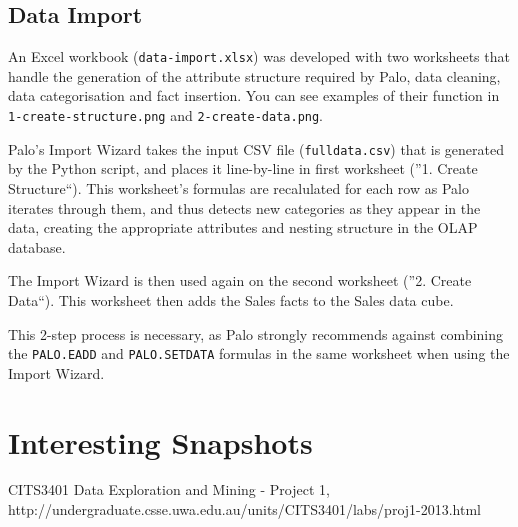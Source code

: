 \documentclass[12pt, a4paper]{article}
\begin{document}
\subsection*{Data Import}

An Excel workbook (\texttt{data-import.xlsx}) was developed with two worksheets that handle the generation of the attribute structure required by Palo, data cleaning, data categorisation and fact insertion. You can see examples of their function in \texttt{1-create-structure.png} and \texttt{2-create-data.png}.

Palo's Import Wizard takes the input CSV file (\texttt{fulldata.csv}) that is generated by the Python script, and places it line-by-line in first worksheet (''1. Create Structure``).
This worksheet's formulas are recalulated for each row as Palo iterates through them, and thus detects new categories as they appear in the data, creating the appropriate attributes and nesting structure in the OLAP database.

The Import Wizard is then used again on the second worksheet (''2. Create Data``). This worksheet then adds the Sales facts to the Sales data cube.

This 2-step process is necessary, as Palo strongly recommends against combining the \texttt{PALO.EADD} and \texttt{PALO.SETDATA} formulas in the same worksheet when using the Import Wizard.

\section*{Interesting Snapshots}



\begin{thebibliography}{9}

	CITS3401 Data Exploration and Mining - Project 1,
	http://undergraduate.csse.uwa.edu.au/units/CITS3401/labs/proj1-2013.html
		
\end{thebibliography}


\end{document}
